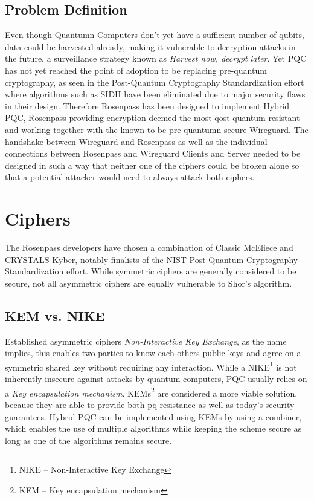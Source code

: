 \documentclass[sigconf]{acmart}
\begin{document}
\subsection{Problem Definition}
Even though Quantumn Computers don't yet have a sufficient number of qubits, data could be harvested already, making it vulnerable to decryption attacks in the future, a surveillance strategy known as \textit{Harvest now, decrypt later}. Yet PQC has not yet reached the point of adoption to be replacing pre-quantum cryptography, as seen in the Post-Quantum Cryptography Standardization effort where algorithms such as SIDH have been eliminated due to major security flaws in their design\cite{cryptoeprint:2022/975}. Therefore Rosenpass has been designed to implement Hybrid PQC\cite{cryptoeprint:2022/1225}, Rosenpass providing encryption deemed the most qost-quantum resistant and working together with the known to be pre-quantumn secure Wireguard. The handshake between Wireguard and Rosenpass as well as the individual connections between Rosenpass and Wireguard Clients and Server needed to be designed in such a way that neither one of the ciphers could be broken alone so that a potential attacker would need to always attack both ciphers.


\section{Ciphers}
The Rosenpass developers have chosen a combination of Classic McEliece and CRYSTALS-Kyber, notably finalists of the NIST Post-Quantum Cryptography Standardization effort\cite{pqc-standardization}. While symmetric ciphers are generally considered to be secure, not all asymmetric ciphers are equally vulnerable to Shor's algorithm.

\subsection{KEM vs. NIKE}
Established asymmetric ciphers \textit{Non-Interactive Key Exchange}, as the name implies, this enables two parties to know each others public keys and agree on a symmetric shared key without requiring any interaction\cite{cryptoeprint:2012/732}. While a NIKE\footnote{NIKE -- Non-Interactive Key Exchange} is not inherently insecure against attacks by quantum computers, PQC usually relies on a \textit{Key encapsulation mechanism}. KEMs\footnote{KEM -- Key encapsulation mechanism} are considered a more viable solution, because they are able to provide both pq-resistance as well as today's security guarantees. Hybrid PQC can be implemented using KEMs by using a combiner, which enables the use of multiple algorithms while keeping the scheme secure as long as one of the algorithms remains secure\cite{cryptoeprint:2012/732}.
\end{document}
